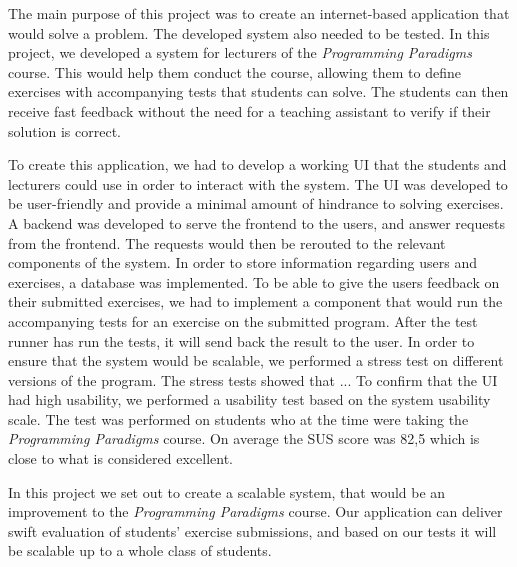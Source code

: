 The main purpose of this project was to create an internet-based application that would solve a problem. The developed system also needed to be tested. 
In this project, we developed a system for lecturers of the \textit{Programming Paradigms} course. 
This would help them conduct the course, allowing them to define exercises with accompanying tests that students can solve. 
The students can then receive fast feedback without the need for a teaching assistant to verify if their solution is correct. 

To create this application, we had to develop a working UI that the students and lecturers could use in order to interact with the system. The UI was developed to be user-friendly and provide a minimal amount of hindrance to solving exercises.
A backend was developed to serve the frontend to the users, and answer requests from the frontend. 
The requests would then be rerouted to the relevant components of the system. 
In order to store information regarding users and exercises, a database was implemented.
To be able to give the users feedback on their submitted exercises, we had to implement a component that would run the accompanying tests for an exercise on the submitted program. 
After the test runner has run the tests, it will send back the result to the user.
In order to ensure that the system would be scalable, we performed a stress test on different versions of the program. 
The stress tests showed that ... 
To confirm that the UI had high usability, we performed a usability test based on the system usability scale.
The test was performed on students who at the time were taking the \textit{Programming Paradigms} course.
On average the SUS score was 82,5 which is close to what is considered excellent.  

In this project we set out to create a scalable system, that would be an improvement to the \textit{Programming Paradigms} course.
Our application can deliver swift evaluation of students' exercise submissions, and based on our tests it will be scalable up to a whole class of students.

